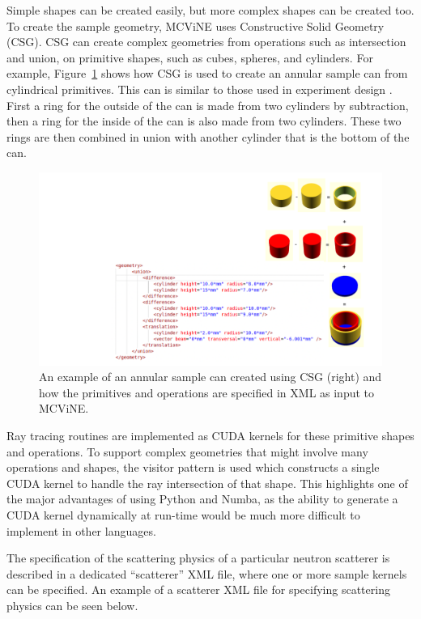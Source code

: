 Simple shapes can be created easily, but more complex shapes can be created too.
To create the sample geometry, MCViNE uses Constructive Solid Geometry (CSG).
CSG can create complex geometries from operations such as intersection and union, on primitive shapes, such as cubes, spheres, and cylinders.
For example, Figure~\ref{fig:csg} shows how CSG is used to create an annular sample can from cylindrical primitives. This can is similar to those used in experiment design \cite{PhysRevB.107.094511}.
First a ring for the outside of the can is made from two cylinders by subtraction, then a ring for the inside of the can is also made from two cylinders.  These two rings are then combined in union with another cylinder that is the bottom of the can.

\begin{figure}[h]
    \centering
    \includegraphics[trim = {1.2cm 0 4cm 0 }, width=\columnwidth]{figures/mcvine_CSG_example.png}
    \caption{An example of an annular sample can  created using CSG (right) and how the primitives and operations are specified in XML as input to MCViNE.}
    \label{fig:csg}
\end{figure}

Ray tracing routines are implemented as CUDA kernels for these primitive shapes and operations. To support complex geometries that might involve many operations and shapes, the visitor pattern is used which constructs a single CUDA kernel to handle the ray intersection of that shape. This highlights one of the major advantages of using Python and Numba, as the ability to generate a CUDA kernel dynamically at run-time would be much more difficult to implement in other languages.

The specification of the scattering physics of a particular neutron scatterer is described in a dedicated ``scatterer'' XML file, where one or more sample kernels can be specified.
An example of a scatterer XML file for specifying scattering physics can be seen below.

